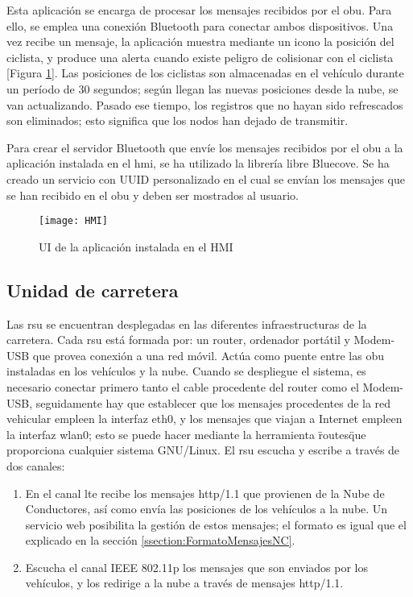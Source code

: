 Esta aplicación se encarga de procesar los mensajes recibidos por el \gls{obu}. Para
ello, se emplea una conexión Bluetooth para conectar ambos dispositivos. Una vez
recibe un mensaje, la aplicación muestra mediante un icono la posición del ciclista,
y produce una alerta cuando existe peligro de colisionar con el ciclista [Figura
\ref{figure:HMI}]. Las posiciones de los ciclistas son almacenadas en el vehículo
durante un período de 30 segundos; según llegan las nuevas posiciones desde la nube,
se van actualizando. Pasado ese tiempo, los registros que no hayan sido refrescados son
eliminados; esto significa que los nodos han dejado de transmitir.

Para crear el servidor Bluetooth que envíe los mensajes recibidos por el \gls{obu} a la
aplicación instalada en el \gls{hmi}, se ha utilizado la librería libre Bluecove. Se ha
creado un servicio con UUID personalizado en el cual se envían los mensajes que se han
recibido en el \gls{obu} y deben ser mostrados al usuario.

\begin{figure}[H]
	\begin{center}
		\texttt{[image: HMI]}
		\caption{UI de la aplicación instalada en el HMI}
		\label{figure:HMI}
	\end{center}
\end{figure}

\subsection{Unidad de carretera}
Las \gls{rsu} se encuentran desplegadas en las diferentes infraestructuras de la
carretera. Cada \gls{rsu} está formada por: un router, ordenador portátil y Modem-USB
que provea conexión a una red móvil. Actúa como puente entre las \gls{obu} instaladas
en los vehículos y la nube. Cuando se despliegue el sistema, es necesario conectar
primero tanto el cable procedente del router como el Modem-USB, seguidamente hay que
establecer que los mensajes procedentes de la red vehicular empleen la interfaz eth0,
y los mensajes que viajan a Internet empleen la interfaz wlan0; esto se puede hacer
mediante la herramienta \"routes\" que proporciona cualquier sistema GNU/Linux. El \gls{rsu}
escucha y escribe a través de dos canales:
\begin{enumerate}
	\item En el canal \gls{lte} recibe los mensajes \Gls{http/1.1} que provienen de la
	Nube de Conductores, así como envía las posiciones de los vehículos a la nube. Un
	servicio web posibilita la gestión de estos mensajes; el formato es igual que el
	explicado en la sección \ref{ssection:FormatoMensajesNC}.

	\item Escucha el canal IEEE 802.11p los mensajes que son enviados por los vehículos,
	y los redirige a la nube a través de mensajes \Gls{http/1.1}.
\end{enumerate}


